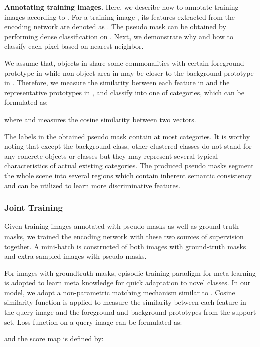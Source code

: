 \documentclass[10pt,twocolumn,letterpaper]{article}
\begin{document}
\vspace{0.2cm}
\noindent
\textbf{Annotating training images.} Here, we describe how to annotate training images according to . For a training image , its features extracted from the encoding network are denoted as . The pseudo mask  can be obtained by performing dense classification on . Next, we demonstrate why and how to classify each pixel based on nearest neighbor. 

We assume that, objects in  share some commonalities with certain foreground prototype in  while non-object area in  may be closer to the background prototype in .
Therefore, we measure the similarity between each feature  in  and the  representative prototypes in , and classify  into one of  categories, which can be formulated as:
\vspace{-0.1cm}

where  and  measures the cosine similarity between two vectors.

The labels in the obtained pseudo mask  contain at most  categories. It is worthy noting that except the background class, other  clustered classes do not stand for any concrete objects or classes but they may represent several typical characteristics of actual existing categories. The produced pseudo masks segment the whole scene into several regions which contain inherent semantic consistency and can be utilized to learn more discriminative features. 

\subsubsection{Joint Training}
Given training images annotated with pseudo masks as well as ground-truth masks, we trained the encoding network with these two sources of supervision together. A mini-batch is constructed of both images with ground-truth masks and extra sampled images with pseudo masks.

For images with groundtruth masks, episodic training paradigm for meta learning is adopted to learn meta knowledge for quick adaptation to novel classes. In our model, we adopt a non-parametric matching mechanism similar to \cite{wang2019panet, liu2020part}. Cosine similarity function is applied to measure the similarity between each feature in the query image and the foreground and background prototypes from the support set. Loss function on a query image can be formulated as:
\vspace{-0.15cm}

and the score map  is defined by:
\vspace{-0.15cm}
\end{document}
